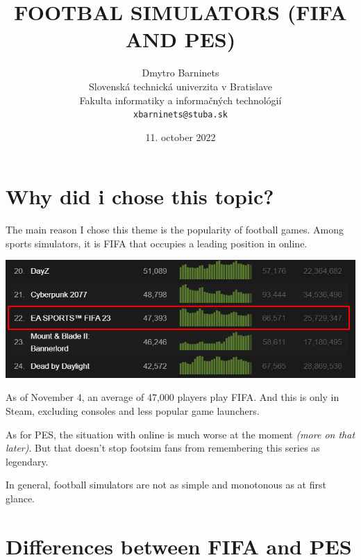 \documentclass[12pt,twoside,english,a4paper]{article}
\title{FOOTBAL SIMULATORS (FIFA AND PES)}
\author{Dmytro Barninets\\[2pt]
	{\small Slovenská technická univerzita v Bratislave}\\
	{\small Fakulta informatiky a informačných technológií}\\
	{\large \texttt{xbarninets@stuba.sk}}
	}
\date{\large 11. october 2022}
\begin{document}
\maketitle


\section{Why did i chose this topic?} \label{mainparagraph}

The main reason I chose this theme is the popularity of football games. Among sports simulators, it is FIFA that occupies a leading position in online.


\includegraphics[width=150mm,scale=1.5]{fifa_charts.png} \label{chartsphoto}


As of November 4, an average of 47,000 players play FIFA. And this is only in Steam, excluding consoles and less popular game launchers.


As for PES, the situation with online is much worse at the moment \emph{(more on that later)}. But that doesn't stop footsim fans from remembering this series as legendary.

In general, football simulators are not as simple and monotonous as at first glance.

\section{Differences between FIFA and PES} \label{differences}\cite{Gaming.net}
\end{document}
